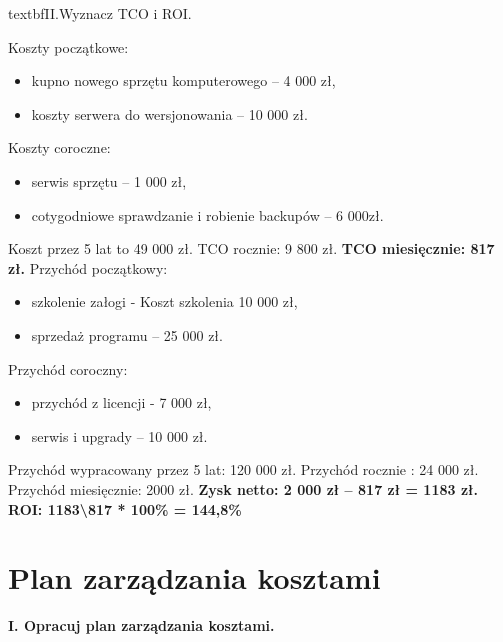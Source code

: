 textbf{II.Wyznacz TCO i ROI.}

Koszty początkowe:
\begin{itemize}

\item kupno nowego sprzętu komputerowego – 4 000 zł,
\item koszty serwera do wersjonowania – 10 000 zł.
\end{itemize}

Koszty coroczne:
\begin{itemize}

\item serwis sprzętu – 1 000 zł,
\item cotygodniowe sprawdzanie i robienie backupów – 6 000zł.
\end{itemize}

Koszt przez  5 lat to 49 000 zł.
TCO rocznie:  9 800 zł.
\textbf{TCO miesięcznie:  817 zł.}
Przychód początkowy:
\begin{itemize}

\item szkolenie załogi - Koszt szkolenia 10 000 zł,
\item sprzedaż programu – 25 000 zł.
\end{itemize}

Przychód coroczny:
\begin{itemize}

\item przychód  z licencji - 7 000 zł,
\item serwis i upgrady – 10 000 zł.
\end{itemize}

Przychód wypracowany przez 5 lat: 120 000 zł.
Przychód rocznie : 24 000 zł.
Przychód miesięcznie: 2000 zł.
\textbf{Zysk netto: 2 000 zł – 817 zł = 1183 zł.}
\textbf{ROI:  1183\backslash817 * 100\% = 144,8\%} 


\section{Plan zarządzania kosztami}

\textbf{I. Opracuj plan zarządzania kosztami.}

